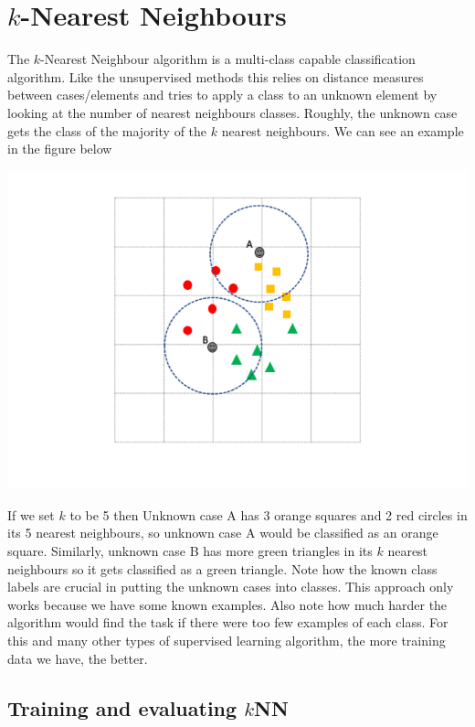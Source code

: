 \documentclass[
]{book}
\begin{document}
\hypertarget{k-nearest-neighbours}{%
\section{\texorpdfstring{\(k\)-Nearest Neighbours}{k-Nearest Neighbours}}\label{k-nearest-neighbours}}

The \(k\)-Nearest Neighbour algorithm is a multi-class capable classification algorithm. Like the unsupervised methods this relies on distance measures between cases/elements and tries to apply a class to an unknown element by looking at the number of nearest neighbours classes. Roughly, the unknown case gets the class of the majority of the \(k\) nearest neighbours. We can see an example in the figure below

\includegraphics{figs/knn.png}

If we set \(k\) to be 5 then Unknown case A has 3 orange squares and 2 red circles in its 5 nearest neighbours, so unknown case A would be classified as an orange square. Similarly, unknown case B has more green triangles in its \(k\) nearest neighbours so it gets classified as a green triangle. Note how the known class labels are crucial in putting the unknown cases into classes. This approach only works because we have some known examples. Also note how much harder the algorithm would find the task if there were too few examples of each class. For this and many other types of supervised learning algorithm, the more training data we have, the better.

\hypertarget{training-and-evaluating-knn}{%
\subsection{\texorpdfstring{Training and evaluating \(k\)NN}{Training and evaluating kNN}}\label{training-and-evaluating-knn}}
\end{document}
